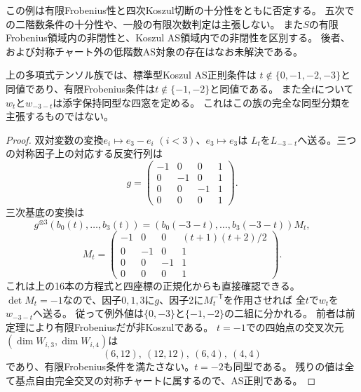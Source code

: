 \begin{remark}
この例は有限Frobenius性と四次Koszul切断の十分性をともに否定する。
五次での二階数条件の十分性や、一般の有限次数判定は主張しない。
また$S$の有限Frobenius領域内の非閉性と、Koszul AS領域内での非閉性を区別する。
後者、および対称チャート外の低階数AS対象の存在はなお未解決である。
\end{remark}

\begin{corollary}[この一変数族の全例外値]\label{cor:nonkoszul-boundary-all-parameters}
上の多項式テンソル族では、標準型Koszul AS正則条件は
$t\notin\{0,-1,-2,-3\}$と同値であり、有限Frobenius条件は$t\notin\{-1,-2\}$と同値である。
また全$t$について$w_t$と$w_{-3-t}$は添字保持同型な四窓を定める。
これはこの族の完全な同型分類を主張するものではない。
\end{corollary}
\begin{proof}
双対変数の変換$e_i\mapsto e_3-e_i$ $(i<3)$、$e_3\mapsto e_3$は
$L_t$を$L_{-3-t}$へ送る。三つの対称因子上の対応する反変行列は
\[
 g=\begin{pmatrix}-1&0&0&1\\0&-1&0&1\\0&0&-1&1\\0&0&0&1\end{pmatrix}.
\]
三次基底の変換は
\[
 g^{\otimes3}(b_0(t),\ldots,b_3(t))
 =(b_0(-3-t),\ldots,b_3(-3-t))M_t,\qquad
\]
\[
 M_t=\begin{pmatrix}
 -1&0&0&(t+1)(t+2)/2\\0&-1&0&1\\0&0&-1&1\\0&0&0&1
 \end{pmatrix}.
\]
これは上の16本の方程式と四座標の正規化からも直接確認できる。
$\det M_t=-1$なので、因子$0,1,3$に$g$、因子2に$M_t^{-\mathsf T}$を作用させれば
全$t$で$w_t$を$w_{-3-t}$へ送る。
従って例外値は$\{0,-3\}$と$\{-1,-2\}$の二組に分かれる。
前者は前定理により有限Frobeniusだが非Koszulである。
$t=-1$での四始点の交叉次元$(\dim W_{i,3},\dim W_{i,4})$は
\[
 (6,12),\ (12,12),\ (6,4),\ (4,4)
\]
であり、有限Frobenius条件を満たさない。$t=-2$も同型である。
残りの値は全て基点自由完全交叉の対称チャートに属するので、AS正則である。
\end{proof}

